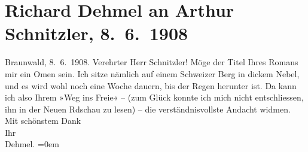 

         \renewcommand{\erwaehnteOrte}{Orte: Braunwald, Schweiz, Wien}
         \renewcommand{\erwaehnteWerke}{Werke: Der Weg ins Freie. Roman, Die neue Rundschau}
               \section[Richard Dehmel an Arthur Schnitzler, 8. 6. 1908]{ Richard Dehmel an Arthur Schnitzler, 8. 6. 1908}\nopagebreak{}\rehead{ }\begin{ledgroupsized}[t]{13cm}\normalsize\beginnumbering \toendnotes[C]{\smallbreak\pagebreak[2]} 
\toendnotes[C]{\smallbreak}\pstart
           \raggedleft{}{\pb}Braunwald,
                        8. 6. 1908.\pend
           \pstart{}Verehrter Herr Schnitzler!\pend\pstart
           Möge der Titel Ihres Romans
                    mir ein Omen sein. Ich sitze nämlich auf einem Schweizer Berg in dickem Nebel, und es wird wohl noch eine Woche
                    dauern, bis der Regen herunter ist. Da kann ich also Ihrem »Weg ins Freie« – (zum Glück konnte ich mich nicht
                    entschliessen, ihn in der Neuen Rdschau zu
                    lesen) – die verständnisvollste Andacht widmen.\pend
           \pstart
           Mit schönstem Dank{\\[\baselineskip]}Ihr{\\[\baselineskip]}\spacefill\mbox{Dehmel.}\pend
           \leftskip=0em{}
         
         \endnumbering{}\end{ledgroupsized}  \newcommand{\dateiname}{L01775}\newcommand{\titel}{Richard Dehmel an Arthur Schnitzler, 8. 6. 1908}\newcommand{\editorInnen}{ Martin Anton Müller und Gerd-Hermann Susen}
      